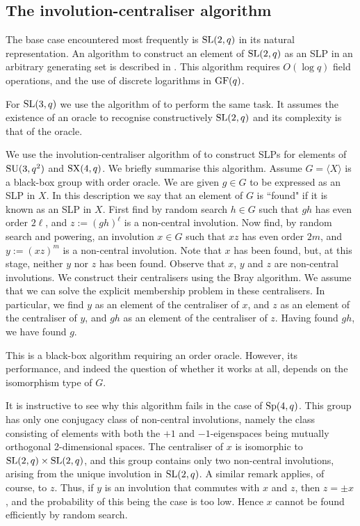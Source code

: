 \documentclass[12pt]{article}
\def\SL{{\rm SL}}
\def\GF{{\rm GF}}
\def\Sp{{\rm Sp}}
\def\SU{{\rm SU}}
\def\SX{{\rm SX}}
\begin{document}
\subsection{The involution-centraliser algorithm} 
\label{ryba-base}

The base case encountered most frequently is $\SL(2,q)$ 
in its natural representation.
An algorithm to construct an element of $\SL(2,q)$ as an SLP  
in an arbitrary generating set is described in \cite{Conderetal05}. 
This algorithm requires $O(\log q)$ field operations, and the 
use of discrete logarithms in $\GF(q)$.

For $\SL(3,q)$ we use the algorithm of \cite{sl3q}
to perform the same task. 
It assumes the existence of an oracle
to recognise constructively $\SL(2, q)$
and its complexity is that of the oracle.

We use the involution-centraliser algorithm of \cite{Ryba}
to construct SLPs for elements of $\SU(3,q^2)$  
and $\SX(4, q)$. We briefly summarise 
this algorithm.  Assume $G = \langle X \rangle$ is a black-box group
with order oracle. We are given 
$g \in G$ to  be expressed as an SLP in $X$.
In this description  we say
that an element of $G$  is ``found" if it is known as an SLP
in $X$. First find by random search $h\in G$ such that
$gh$ has even order $2\ell$, and $z:=(gh)^\ell$ is a non-central
involution. Now  find, by random search and powering, an involution
$x\in G$ such that $xz$ has even order $2m$, and $y:=(xz)^m$ is a
non-central involution. Note that $x$ has been found, but, at this
stage, neither $y$ nor $z$ has been found. 
Observe that $x$, $y$ and $z$
are non-central involutions. 
We construct their centralisers using the Bray algorithm.
We assume that we can  solve the explicit membership problem 
in these centralisers.
In particular, we find $y$ as an element of the centraliser of $x$, 
and $z$ as an
element of the centraliser of $y$, and $gh$ as an element of the
centraliser of $z$. Having found $gh$, we have found $g$.

This is a black-box algorithm  requiring an order oracle.
However, its  performance, and indeed the question of whether 
it works at all, depends on the isomorphism type of $G$.

It is instructive to see why this algorithm fails in the case of
$\Sp(4,q)$. This group has only one conjugacy class of
non-central involutions, namely the class consisting of elements with
both the $+1$ and $-1$-eigenspaces being mutually orthogonal
2-dimensional spaces. The centraliser of $x$ is isomorphic to
$\SL(2,q)\times\SL(2,q)$, and this group contains only two non-central
involutions, arising from the unique involution in $\SL(2,q)$. A
similar remark applies, of course, to $z$. Thus, if $y$ is an
involution that  commutes with $x$ and $z$, then $z=\pm x$, and the
probability of this being the case is too low.
Hence $x$ cannot be found efficiently by random search.
\end{document}
